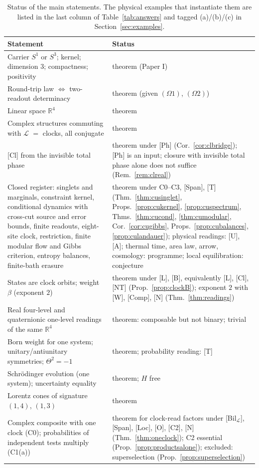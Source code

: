 \documentclass[aps,pra,onecolumn,superscriptaddress,nofootinbib,10pt]{revtex4-2}
\theoremstyle{definition}
\theoremstyle{remark}
\newcommand{\R}{\mathbb{R}}
\newcommand{\cL}{\mathcal{L}}
\begin{document}
\begin{table}[h]
\caption{Status of the main statements.  The physical examples that instantiate them are listed in the
last column of Table~\ref{tab:answers} and tagged (a)/(b)/(c) in Section~\ref{sec:examples}.}
\label{tab:scope}
\footnotesize
\begin{tabular}{@{}p{}p{}@{}}
\toprule
Statement & Status\\
\midrule
Carrier $S^1$ or $S^3$; kernel; dimension $3$; compactness; positivity & theorem (Paper I)\\
Round-trip law $\Leftrightarrow$ two-readout determinacy & theorem (given $(\Omega1)$, $(\Omega2)$)\\
Linear space $\R^4$ & theorem\\
Complex structures commuting with $\cL$ $=$ clocks, all conjugate & theorem\\
{[Cl]} from the invisible total phase & theorem under [Ph] (Cor.~\ref{cor:clbridge}); [Ph] is an input; closure with invisible total phase alone does not suffice (Rem.~\ref{rem:clreal})\\
Closed register: singlets and marginals, constraint kernel, conditional dynamics with cross-cut source and error bounds, finite readouts, eight-site clock, restriction, finite modular flow and Gibbs criterion, entropy balances, finite-bath erasure & theorem under C0--C3, [Span], [T] (Thm.~\ref{thm:cusinglet}, Props.~\ref{prop:cukernel}, \ref{prop:cuspectrum}, Thms.~\ref{thm:cucond}, \ref{thm:cumodular}, Cor.~\ref{cor:cugibbs}, Props.~\ref{prop:cubalances}, \ref{prop:culandauer}); physical readings: [U], [A]; thermal time, area law, arrow, cosmology: programme; local equilibration: conjecture\\
States are clock orbits; weight $\beta$ (exponent $2$) & theorem under [L], [B], equivalently [L], [Cl], [NT] (Prop.~\ref{prop:clockB}); exponent $2$ with [W], [Comp], [N] (Thm.~\ref{thm:readings})\\
Real four-level and quaternionic one-level readings of the same $\R^4$ & theorem: composable but not binary; trivial\\
Born weight for one system; unitary/antiunitary symmetries; $\Theta^2=-1$ & theorem; probability reading: [T]\\
Schr\"odinger evolution (one system); uncertainty equality & theorem; $H$ free\\
Lorentz cones of signature $(1,4)$, $(1,3)$ & theorem\\
Complex composite with one clock (C0); probabilities of independent tests multiply (C1(a)) & theorem for clock-read factors under [Bil$_\cL$], [Span], [Loc], [O], [C2], [N] (Thm.~\ref{thm:oneclock}); C2 essential (Prop.~\ref{prop:productsalone}); excluded: superselection (Prop.~\ref{prop:superselection})\\

\end{tabular}
\end{table}
\end{document}
